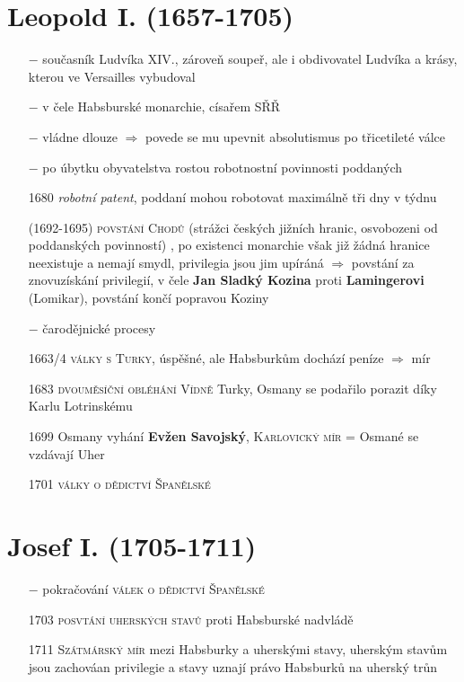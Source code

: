\documentclass{article}
\begin{document}
\section*{Leopold I. (1657-1705)}
\begin{itemize}
    \vspace{-0.5em}
    \setlength\itemsep{0.15em}
    \item[$-$] současník Ludvíka XIV., zároveň soupeř, ale i obdivovatel Ludvíka a krásy, kterou ve Versailles vybudoval
    \item[$-$] v čele Habsburské monarchie, císařem SŘŘ
    \item[$-$] vládne dlouze $\Rightarrow$ povede se mu upevnit absolutismus po třicetileté válce
    \item[$-$] po úbytku obyvatelstva rostou robotnostní povinnosti poddaných
    \item[1680] \textit{robotní patent}, poddaní mohou robotovat maximálně tři dny v týdnu
    \item[(1692-1695)] \textsc{povstání Chodů} (strážci českých jižních hranic, osvobozeni od poddanských povinností) , po existenci monarchie však již žádná hranice neexistuje a nemají smydl, privilegia jsou jim upíráná $\Rightarrow$ povstání za znovuzískání privilegií, v čele \textbf{Jan Sladký Kozina} proti \textbf{Lamingerovi} (Lomikar), povstání končí popravou Koziny
    \item[$-$] čarodějnické procesy
    \item[1663/4] \textsc{války s Turky}, úspěšné, ale Habsburkům dochází peníze $\Rightarrow$ mír
    \item[1683]  \textsc{dvouměsíční obléhání Vídně} Turky, Osmany se podařilo porazit díky Karlu Lotrinskému
    \item[1699] Osmany vyhání \textbf{Evžen Savojský}, \textsc{Karlovický mír} = Osmané se vzdávají Uher
    \item[1701] \textsc{války o dědictví Španělské}
\end{itemize}


\section*{Josef I. (1705-1711)}
\begin{itemize}
    \vspace{-0.5em}
    \setlength\itemsep{0.15em}
    \item[$-$] pokračování \textsc{válek o dědictví Španělské}
    \item[1703] \textsc{posvtání uherských stavů} proti Habsburské nadvládě
    \item[1711] \textsc{Szátmárský mír} mezi Habsburky a uherskými stavy, uherským stavům jsou zachováan privilegie a stavy uznají právo Habsburků na uherský trůn
\end{itemize}
\end{document}
